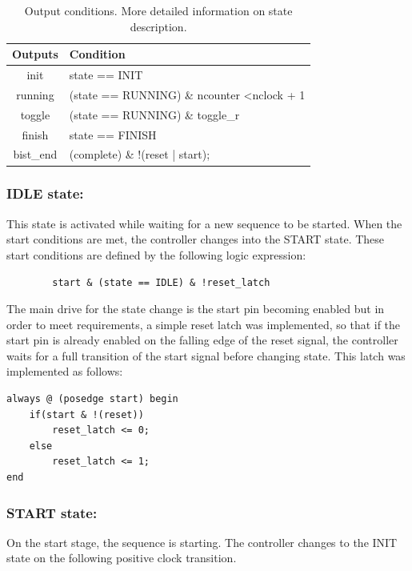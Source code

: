 \documentclass[12pt]{article}
\begin{document}
    \begin{table}[H]
    \centering
    \caption{Output conditions. More detailed information on state description.}
    \label{tab:outputcond}
    \begin{tabular}{@{}cl@{}}
    \textbf{Outputs} & \textbf{Condition}                                  \\ \midrule
    init             & state == INIT                                                \\
    running          & (state == RUNNING) \& ncounter \textless nclock + 1 \\
    toggle           & (state == RUNNING) \& toggle\_r                     \\
    finish           & state == FINISH                                          \\
    bist\_end        & (complete) \& !(reset | start);                     \\ \bottomrule
    \end{tabular}
    \end{table}
    
    \subsubsection*{IDLE state:}
    This state is activated while waiting for a new sequence to be started. When the start conditions are met, the controller changes into the START state. \newline
    These start conditions are defined by the following logic expression:
    \begin{verbatim}
        start & (state == IDLE) & !reset_latch
    \end{verbatim}
    
    The main drive for the state change is the start pin becoming enabled but in order to meet requirements, a simple reset latch was implemented, so that if the start pin is already enabled on the falling edge of the reset signal, the controller waits for a full transition of the start signal before changing state. This latch was implemented as follows:
    
    \begin{lstlisting}[caption={Reset latch implementation.},captionpos=b]
always @ (posedge start) begin
	if(start & !(reset))
		reset_latch <= 0;
	else
		reset_latch <= 1;
end
    \end{lstlisting}
    
    
    \subsubsection*{START state:}
    On the start stage, the sequence is starting. The controller changes to the INIT state on the following positive clock transition.
\end{document}

